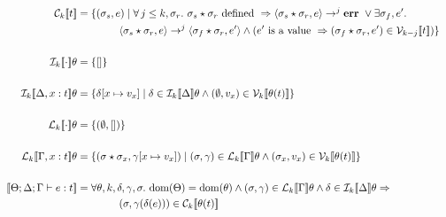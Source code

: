 \begin{align*}
\\
    \C{k}{ t } &= \{ (\sigma_s, e) \mid \forall \, j \leq k, \sigma_r.\ \sigma_s \star \sigma_r \textrm{ defined } \Rightarrow \langle \sigma_s \star \sigma_r, e \rangle \rightarrow^j \ottkw{err}\ \vee \exists \sigma_f, e'.\\
               & \qquad \qquad \langle \sigma_s \star \sigma_r, e \rangle \rightarrow^j \langle \sigma_f \star \sigma_r, e' \rangle \wedge ( e' \textrm { is a value } \Rightarrow ( \sigma_f \star \sigma_r, e' ) \in \V{k-j}{t} ) \} \\
\\
    \den{I}{k}{ \cdot } \theta &= \{ [] \} \\
\\
    \den{I}{k}{ \Delta, x : t } \theta &= \{ \delta[x \mapsto v_x ] \mid \delta \in \den{I}{k}{\Delta}\theta \wedge (\empH, v_x) \in \V{k}{\theta(t)} \} \\
\\
    \den{L}{k}{ \cdot } \theta &= \{ (\empH, []) \} \\
\\
    \den{L}{k}{ \Gamma, x : t } \theta &= \{ (\sigma \star \sigma_x, \gamma[x \mapsto v_x ]) \mid (\sigma, \gamma) \in \den{L}{k}{\Gamma}\theta \wedge (\sigma_x, v_x) \in \V{k}{\theta(t)} \} \\
\\
\den{}{}{ \Theta; \Delta ; \Gamma \vdash e : t } &= \forall \theta, k, \delta, \gamma, \sigma.\ \dom(\Theta) = \dom(\theta) \wedge (\sigma, \gamma) \in \den{L}{k}{ \Gamma }\theta \wedge \delta \in \den{I}{k}{ \Delta }\theta \Rightarrow \\
                                                 & \qquad \qquad (\sigma, \gamma(\delta(e))) \in \C{k}{ \theta(t) }
\end{align*}
